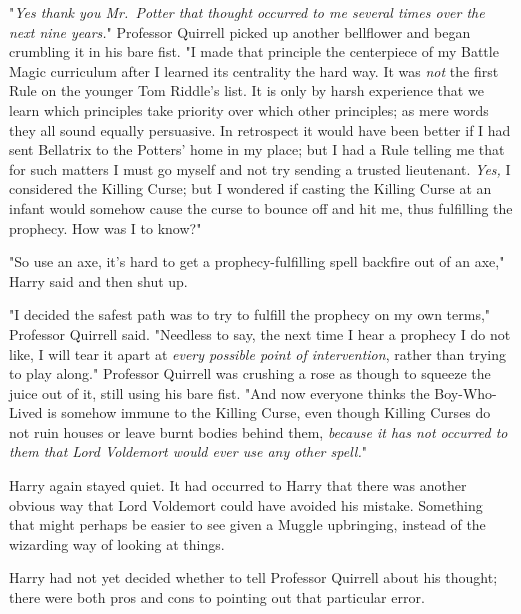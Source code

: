 "\emph{Yes thank you Mr.~Potter that thought occurred to me several times over
the next nine years.}" Professor Quirrell picked up another bellflower and
began crumbling it in his bare fist. "I made that principle the centerpiece of
my Battle Magic curriculum after I learned its centrality the hard way. It was
\emph{not} the first Rule on the younger Tom Riddle's list. It is only by harsh
experience that we learn which principles take priority over which other
principles; as mere words they all sound equally persuasive. In retrospect it
would have been better if I had sent Bellatrix to the Potters' home in my
place; but I had a Rule telling me that for such matters I must go myself and
not try sending a trusted lieutenant. \emph{Yes,} I considered the Killing
Curse; but I wondered if casting the Killing Curse at an infant would somehow
cause the curse to bounce off and hit me, thus fulfilling the prophecy. How was
I to know?"

"So use an axe, it's hard to get a prophecy-fulfilling spell backfire out of an
axe," Harry said and then shut up.

"I decided the safest path was to try to fulfill the prophecy on my own terms,"
Professor Quirrell said. "Needless to say, the next time I hear a prophecy I do
not like, I will tear it apart at \emph{every possible point of intervention},
rather than trying to play along." Professor Quirrell was crushing a rose as
though to squeeze the juice out of it, still using his bare fist. "And now
everyone thinks the Boy-Who-Lived is somehow immune to the Killing Curse, even
though Killing Curses do not ruin houses or leave burnt bodies behind them,
\emph{because it has not occurred to them that Lord Voldemort would ever use
any other spell.}"

Harry again stayed quiet. It had occurred to Harry that there was another
obvious way that Lord Voldemort could have avoided his mistake. Something that
might perhaps be easier to see given a Muggle upbringing, instead of the
wizarding way of looking at things.

Harry had not yet decided whether to tell Professor Quirrell about his thought;
there were both pros and cons to pointing out that particular error.

